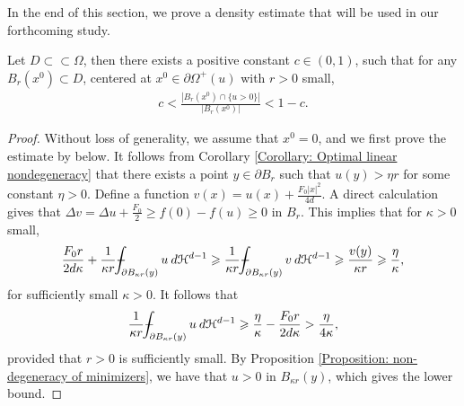 \documentclass[11pt,reqno]{amsart}
\begin{document}
In the end of this section, we prove a density estimate that will be used in our forthcoming study.
\begin{proposition}\label{Proposition: density estimates}
	Let $D\subset\subset\Omega$, then there exists a positive constant $c\in(0,1)$, such that for any $B_{r}(x^{0})\subset D$, centered at $x^{0}\in\partial\varOmega^{+}(u)$ with $r>0$ small,
	\begin{align}\label{Formula: O(12)}
		c<\frac{|B_{r}(x^{0})\cap\{u>0\}|}{|B_{r}(x^{0})|}<1-c.
	\end{align}
\end{proposition}
\begin{proof}
	Without loss of generality, we assume that $x^{0}=0$, and we first prove the estimate by below. It follows from Corollary \ref{Corollary: Optimal linear nondegeneracy} that there exists a point $y\in\partial B_{r}$ such that $u(y)>\eta r$ for some constant $\eta>0$. Define a function $v(x)=u(x)+\frac{F_{0}|x|^{2}}{4d}$. A direct calculation gives that $\Delta v=\Delta u+\frac{F_{0}}{2}\geqslant f(0)-f(u)\geqslant0$ in $B_{r}$. This implies that for $\kappa>0$ small, 
	\begin{align*}
		\frac{F_{0}r}{2d\kappa}+\frac{1}{\kappa r}\dashint_{\partial B_{\kappa r}(y)}u\:d\mathcal{H}^{d-1}\geqslant\frac{1}{\kappa r}\dashint_{\partial B_{\kappa r}(y)}v\:d\mathcal{H}^{d-1}\geqslant\frac{v(y)}{\kappa r}\geqslant\frac{\eta}{\kappa},
	\end{align*}
	for sufficiently small $\kappa>0$. It follows that 
	\begin{align*}
		\frac{1}{\kappa r}\dashint_{\partial B_{\kappa r}(y)}u\:d\mathcal{H}^{d-1}\geqslant\frac{\eta}{\kappa}-\frac{F_{0}r}{2d\kappa}>\frac{\eta}{4\kappa},
	\end{align*}
	provided that $r>0$ is sufficiently small. By Proposition \ref{Proposition: non-degeneracy of minimizers}, we have that $u>0$ in $B_{\kappa r}(y)$, which gives the lower bound.
	

\end{proof}
\end{document}
